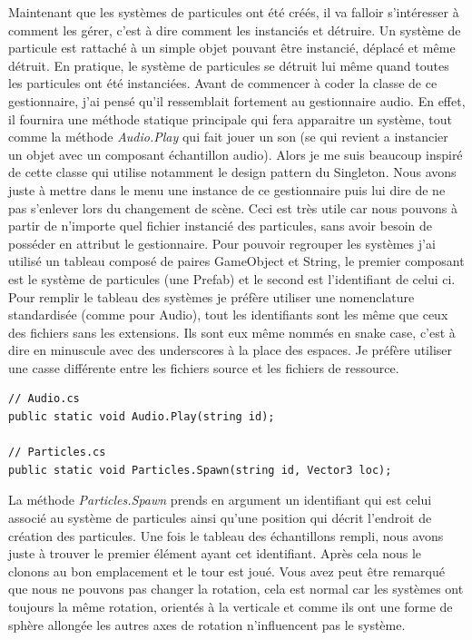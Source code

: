 \documentclass{article}
\begin{document}
Maintenant que les systèmes de particules ont été créés, il va falloir s'intéresser à comment les gérer, c'est à dire comment les instanciés et détruire.
Un système de particule est rattaché à un simple objet pouvant être instancié, déplacé et même détruit. En pratique, le système de particules se détruit lui même quand toutes les particules ont été instanciées.
Avant de commencer à coder la classe de ce gestionnaire, j'ai pensé qu'il ressemblait fortement au gestionnaire audio. En effet, il fournira une méthode statique principale qui fera apparaitre un système, tout comme la méthode \emph{Audio.Play} qui fait jouer un son (se qui revient a instancier un objet avec un composant échantillon audio). Alors je me suis beaucoup inspiré de cette classe qui utilise notamment le design pattern du Singleton. Nous avons juste à mettre dans le menu une instance de ce gestionnaire puis lui dire de ne pas s'enlever lors du changement de scène. Ceci est très utile car nous pouvons à partir de n'importe quel fichier instancié des particules, sans avoir besoin de posséder en attribut le gestionnaire.
Pour pouvoir regrouper les systèmes j'ai utilisé un tableau composé de paires GameObject et String, le premier composant est le système de particules (une Prefab) et le second est l'identifiant de celui ci. Pour remplir le tableau des systèmes je préfère utiliser une nomenclature standardisée (comme pour Audio), tout les identifiants sont les même que ceux des fichiers sans les extensions. Ils sont eux même nommés en snake case, c'est à dire en minuscule avec des underscores à la place des espaces. Je préfère utiliser une casse différente entre les fichiers source et les fichiers de ressource.


\begin{lstlisting}
// Audio.cs
public static void Audio.Play(string id);

// Particles.cs
public static void Particles.Spawn(string id, Vector3 loc);
\end{lstlisting}

La méthode \emph{Particles.Spawn} prends en argument un identifiant qui est celui associé au système de particules ainsi qu'une position qui décrit l'endroit de création des particules. Une fois le tableau des échantillons rempli, nous avons juste à trouver le premier élément ayant cet identifiant. Après cela nous le clonons au bon emplacement et le tour est joué. Vous avez peut être remarqué que nous ne pouvons pas changer la rotation, cela est normal car les systèmes ont toujours la même rotation, orientés à la verticale et comme ils ont une forme de sphère allongée les autres axes de rotation n'influencent pas le système.
\end{document}
